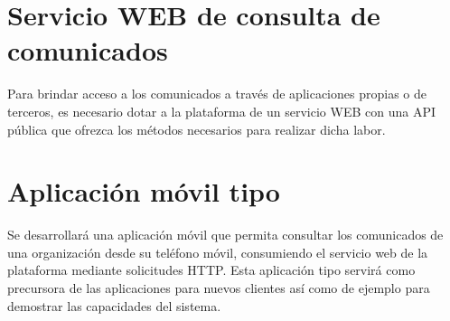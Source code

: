 \section{Servicio WEB de consulta de comunicados}
Para brindar acceso a los comunicados a través de aplicaciones propias o de terceros, es necesario dotar a la plataforma de un servicio WEB con una API pública que ofrezca los métodos necesarios para realizar dicha labor.

\section{Aplicación móvil tipo}
Se desarrollará una aplicación móvil que permita consultar los comunicados de una organización desde su teléfono móvil, consumiendo el servicio web de la plataforma mediante solicitudes HTTP. Esta aplicación tipo servirá como precursora de las aplicaciones para nuevos clientes así como de ejemplo para demostrar las capacidades del sistema.